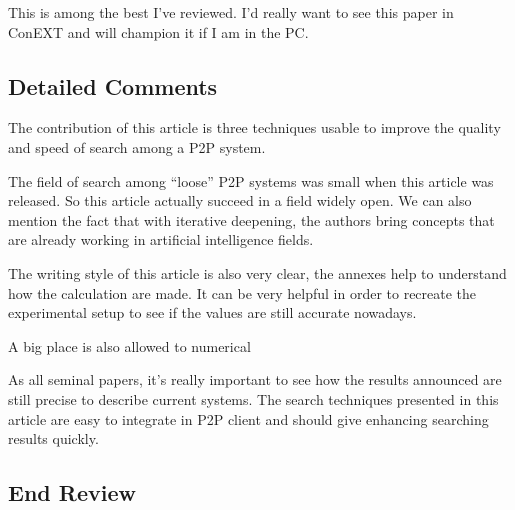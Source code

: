 This is among the best I've reviewed. I'd really want to
see this paper in ConEXT and will champion it if I am in
the PC.

\subsection{Detailed Comments}


The contribution of this article is three techniques usable to improve the
quality and speed of search among a P2P system.


The field of search among ``loose'' P2P systems was small when this article was released.
So this article actually succeed in a field widely open. We can also mention the fact
that with iterative deepening, the authors bring concepts that are already working in artificial
intelligence fields.


The writing style of this article is also very clear, the annexes help to understand
how the calculation are made. It can be very helpful in order to recreate the experimental
setup to see if the values are still accurate nowadays.

A big place is also allowed to numerical


As all seminal papers, it's really important to see how the results announced are still precise
to describe current systems. The search techniques presented in this article are easy to integrate
in P2P client and should give enhancing searching results quickly.

\subsection*{End Review}

\pagebreak
